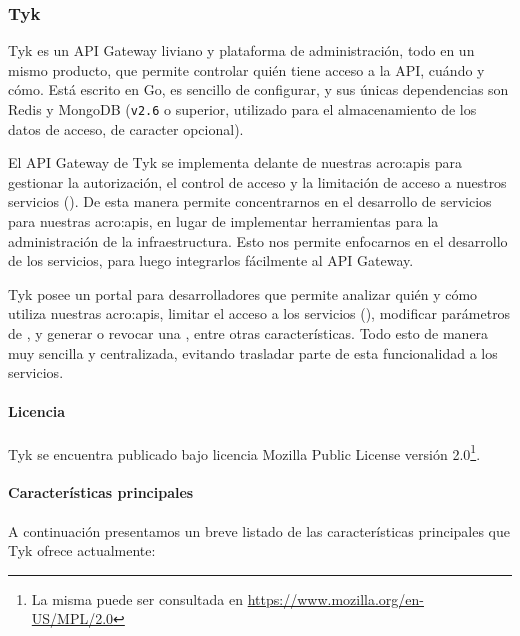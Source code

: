 \subsubsection{Tyk}
\label{soa:tecnologias:tyk}

Tyk es un API Gateway liviano y plataforma de administración, todo en un mismo producto, que permite controlar quién tiene acceso a la API, cuándo y cómo.  Está escrito en Go, es sencillo de configurar, y sus únicas dependencias son Redis y MongoDB (\texttt{v2.6} o superior, utilizado para el almacenamiento de los datos de acceso, de caracter opcional).

El API Gateway de Tyk se implementa delante de nuestras \glspl{acro:api} para gestionar la autorización, el control de acceso y la limitación de acceso a nuestros servicios ().  De esta manera permite concentrarnos en el desarrollo de servicios para nuestras \glspl{acro:api}, en lugar de implementar herramientas para la administración de la infraestructura.  Esto nos permite enfocarnos en el desarrollo de los servicios, para luego integrarlos fácilmente al API Gateway.

Tyk posee un portal para desarrolladores que permite analizar quién y cómo utiliza nuestras \glspl{acro:api}, limitar el acceso a los servicios (), modificar parámetros de , y generar o revocar una , entre otras características.  Todo esto de manera muy sencilla y centralizada, evitando trasladar parte de esta funcionalidad a los servicios.

\paragraph{Licencia}

Tyk se encuentra publicado bajo licencia Mozilla Public License versión 2.0\footnote{La misma puede ser consultada en \url{https://www.mozilla.org/en-US/MPL/2.0}}.

\paragraph{Características principales}

A continuación presentamos un breve listado de las características principales que Tyk ofrece actualmente:

